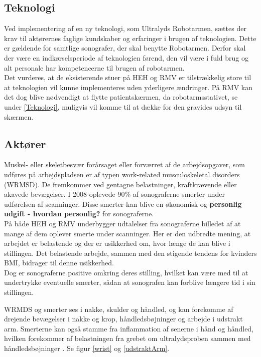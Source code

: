 \subsection{Teknologi}
Ved implementering af en ny teknologi, som Ultralyds Robotarmen, sættes der krav til aktørernes faglige kundskaber og erfaringer i brugen af teknologien. Dette er gældende for samtlige sonografer, der skal benytte Robotarmen. Derfor skal der være en indkørselsperiode af teknologien førend, den vil være i fuld brug og alt personale har kompetencerne til brugen af robotarmen. \\
Det vurderes, at de eksisterende stuer på HEH og RMV er tilstrækkelig store til at teknologien vil kunne implementeres uden yderligere ændringer. På RMV kan det dog blive nødvendigt at flytte patientskærmen, da robotarmsstativet, se under \ref{Teknologi}, muligvis vil komme til at dække for den gravides udsyn til skærmen.  

\subsection{Aktører} \label{aktoerer_organisation}
Muskel- eller skeletbesvær forårsaget eller forværret af de arbejdsopgaver, som udføres på arbejdspladsen er af typen work-related musculoskeletal disorders (WRMSD). De fremkommer ved gentagne belastninger, kraftkrævende eller akavede bevægelser. I 2008 oplevede 90\% af sonograferne smerter under udførelsen af scanninger. Disse smerter kan blive en økonomisk og \textbf{personlig udgift - hvordan personlig?} for sonograferne.\cite{31}\cite{30}\\
På både HEH og RMV underbygger udtalelser fra sonograferne billedet af at mange af dem oplever smerte under scanninger. 
Her er den udbredte mening, at arbejdet er belastende og der er usikkerhed om, hvor længe de kan blive i stillingen. Det belastende arbejde, sammen med den stigende tendens for kvinders BMI, bidrager til denne usikkerhed. \cite{kvinderovervaegt} \\
Dog er sonograferne positive omkring deres stilling, hvilket kan være med til at undertrykke eventuelle smerter, sådan at sonografen kan forblive længere tid i sin stillingen.

WRMDS og smerter ses i nakke, skulder og håndled, og kan forekomme af drejende bevægelser i nakke og krop, håndledsbøjninger og arbejde i udstrakt arm. Smerterne kan også stamme fra inflammation af senerne i hånd og håndled, hvilken forekommer af belastningen fra grebet om ultralydsproben sammen med håndledsbøjninger \cite{31}. Se figur \ref{wrist} og \ref{udstraktArm}.

